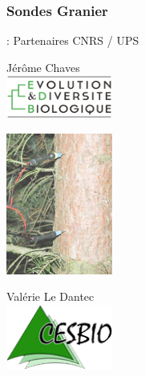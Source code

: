\documentclass[12pt]{beamer}
\begin{document}
            \subsubsection{Sondes Granier}
                \begin{frame}{\subsubsecname: Partenaires CNRS / UPS}
                    \begin{minipage}[t][1in][t]{3.5cm}\vspace{0pt}
                        Jérôme Chaves \\
                        \includegraphics[width=3.5cm]{img/edb.jpg}
                    \end{minipage}
                    \begin{minipage}[t][1in][t]{3.5cm}\vspace{0pt}
                        \includegraphics[width=3.5cm]{img/needles.png}
                    \end{minipage}
                    \begin{minipage}[t][1in][t]{3.5cm}\vspace{0pt}
                        Valérie Le Dantec \\
                        \includegraphics[width=3.5cm]{img/cesbio.png}
                    \end{minipage}
                \end{frame}
\end{document}

